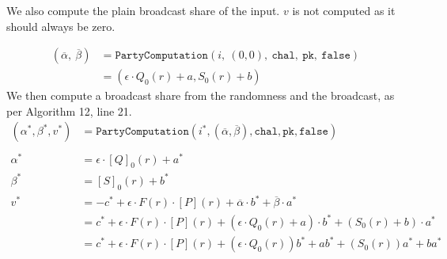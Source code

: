 \documentclass[twoside,11pt,openright]{report}
\begin{document}
We also compute the plain broadcast share of the input. $v$ is not computed as it should always be zero.

\begin{align*}
  (\overline{\alpha},\ \overline{\beta}) & = \texttt{PartyComputation}(i,\ (0,0),\ \texttt{chal},\ \texttt{pk},\ \texttt{false}) \\
                                         & = (\epsilon \cdot Q_0(r) + a, S_0(r)  + b)
\end{align*}
We then compute a broadcast share from the randomness and the broadcast, as per Algorithm 12, line 21.
\begin{align*}
  (\alpha^*, \beta^*, v^*) & = \texttt{PartyComputation}(i^*, (\overline{\alpha},
  \overline{\beta}), \texttt{chal}, \texttt{pk}, \texttt{false})                                                                       \\\\
  \alpha^*                 & = \epsilon \cdot {[Q]}_0(r) + a^*                                                                         \\
  \beta^*                  & = {[S]}_0(r) + b^*                                                                                        \\
  v^*                      & =  -c^* + \epsilon \cdot F(r) \cdot [P](r) + \overline{\alpha} \cdot b^* + \overline{\beta} \cdot a^*     \\
                           & =  c^* + \epsilon \cdot F(r) \cdot [P](r) + (\epsilon \cdot Q_0(r) + a) \cdot b^* + (S_0(r)+ b) \cdot a^* \\
                           & =  c^* + \epsilon \cdot F(r) \cdot [P](r) + (\epsilon \cdot Q_0(r))b^* + ab^* + (S_0(r))a^* + ba^*        \\
\end{align*}
\end{document}
